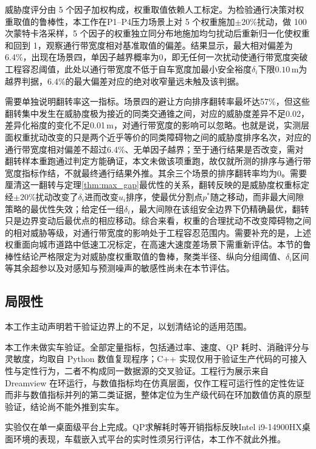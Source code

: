 \documentclass[a4paper,11pt]{ctexart}
\theoremstyle{definition}
\begin{document}
威胁度评分由 5 个因子加权构成，权重取值依赖人工标定。为检验通行决策对权重取值的鲁棒性，本工作在P1--P4压力场景上对 5 个权重施加$\pm 20\%$扰动，做 100 次蒙特卡洛采样，5 个因子的权重独立同分布地施加均匀扰动后重新归一化使权重和回到 1，观察通行带宽度相对基准取值的偏差。结果显示，最大相对偏差为6.4\%，出现在场景四，单因子越界概率为0，即无任何一次扰动使通行带宽度突破工程容忍阈值，此处以通行带宽度不低于自车宽度加最小安全裕度$\delta_i$下限$0.10$\,m为越界判据，6.4\%的最大偏差对应的绝对收窄量远未触及该判据。

需要单独说明翻转率这一指标。场景四的避让方向排序翻转率最坏达57\%，但这些翻转集中发生在威胁度极为接近的同类交通锥之间，对应的威胁度差异不足0.02，差异化裕度的变化不足0.01\,m，对通行带宽度的影响可以忽略。也就是说，实测层面权重扰动改变的只是两个近乎等价的同类障碍物之间的威胁度排序名次，对应的通行带宽度相对偏差不超过6.4\%、无单因子越界；至于通行结果是否改变，需对翻转样本重跑通过判定方能确证，本文未做该项重跑，故仅就所测的排序与通行带宽度指标作结，不就最终通行结果外推。其余三个场景的排序翻转率均为0。需要厘清这一翻转与定理\ref{thm:max_gap}最优性的关系，翻转反映的是威胁度权重标定经$\pm20\%$扰动改变了$\delta_i$进而改变$u_i$排序，使最优分割点$p^{*}$随之移动，而非最大间隙策略的最优性失效；给定任一组$\delta_i$，最大间隙在该组安全边界下仍精确最优，翻转只是边界变动后最优点的相应移动。综合来看，权重的合理扰动不改变障碍物之间的相对威胁等级，对通行带宽度的影响处于工程容忍范围内。需要补充的是，上述权重面向城市道路中低速工况标定，在高速大速度差场景下需重新评估。本节的鲁棒性结论严格限定为对威胁度权重取值的鲁棒，聚类半径、纵向分组阈值、$\delta_i$区间等其余超参以及对感知与预测噪声的敏感性尚未在本节评估。

\subsection{局限性}
\label{subsec:exp_limitations}

本工作主动声明若干验证边界上的不足，以划清结论的适用范围。

本工作未做实车验证。全部定量指标，包括通过率、速度、QP 耗时、消融评分与灵敏度，均取自 Python 数值复现程序；C++ 实现仅用于验证生产代码的可接入性与定性行为，二者不构成同一数据源的交叉验证。工程行为展示来自 Dreamview 在环运行，与数值指标均在仿真层面，仅作工程可运行性的定性佐证而非与数值指标并列的第二类证据，整体定位为生产级代码在环加数值仿真的原型验证，结论尚不能外推到实车。

实验仅在单一桌面级平台上完成。QP求解耗时等开销指标反映Intel i9-14900HX桌面环境的表现，车载嵌入式平台的实时性须另行评估，本工作不就此外推。
\end{document}
